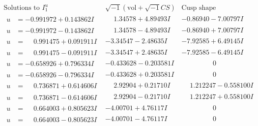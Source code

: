 \documentclass[1p]{elsarticle_modified}
\theoremstyle{definition}
\newcommand{\I}{\sqrt{-1}}
\begin{document}
$$\begin{array}{c|c|c}  
\text{Solutions to }I^u_{1}& \I (\text{vol} + \sqrt{-1}CS) & \text{Cusp shape}\\
 \hline 
\begin{aligned}
u &= -0.991972 + 0.143862 I\end{aligned}
 & \phantom{-}1.34578 + 4.89493 I & -0.86940 - 7.00797 I \\ \hline\begin{aligned}
u &= -0.991972 - 0.143862 I\end{aligned}
 & \phantom{-}1.34578 - 4.89493 I & -0.86940 + 7.00797 I \\ \hline\begin{aligned}
u &= \phantom{-}0.991475 + 0.091911 I\end{aligned}
 & -3.34547 - 2.48635 I & -7.92585 + 6.49145 I \\ \hline\begin{aligned}
u &= \phantom{-}0.991475 - 0.091911 I\end{aligned}
 & -3.34547 + 2.48635 I & -7.92585 - 6.49145 I \\ \hline\begin{aligned}
u &= -0.658926 + 0.796334 I\end{aligned}
 & -0.433628 - 0.203581 I & \phantom{-0.000000 } 0 \\ \hline\begin{aligned}
u &= -0.658926 - 0.796334 I\end{aligned}
 & -0.433628 + 0.203581 I & \phantom{-0.000000 } 0 \\ \hline\begin{aligned}
u &= \phantom{-}0.736871 + 0.614606 I\end{aligned}
 & \phantom{-}2.92904 + 0.21710 I & \phantom{-}1.212247 - 0.558100 I \\ \hline\begin{aligned}
u &= \phantom{-}0.736871 - 0.614606 I\end{aligned}
 & \phantom{-}2.92904 - 0.21710 I & \phantom{-}1.212247 + 0.558100 I \\ \hline\begin{aligned}
u &= \phantom{-}0.664003 + 0.805623 I\end{aligned}
 & -4.00701 + 4.76117 I & \phantom{-0.000000 } 0 \\ \hline\begin{aligned}
u &= \phantom{-}0.664003 - 0.805623 I\end{aligned}
 & -4.00701 - 4.76117 I & \phantom{-0.000000 } 0 \\ \hline\begin{aligned}

\end{aligned}
\end{array}$$
\end{document}
